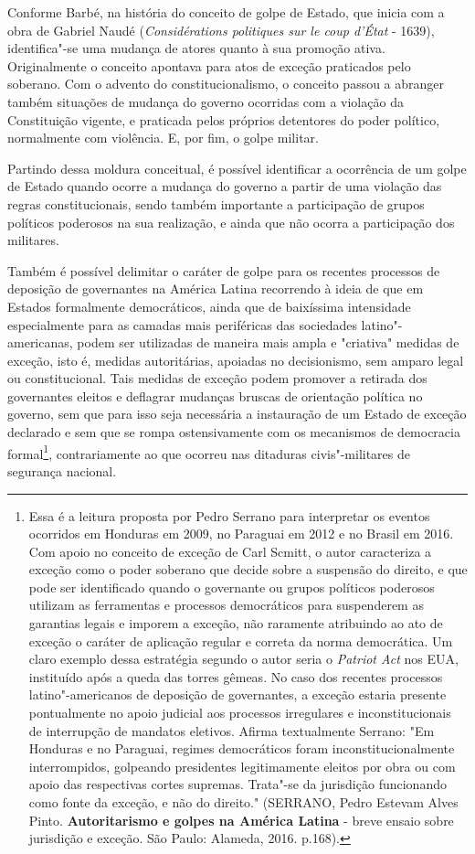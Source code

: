Conforme Barbé, na história do conceito de golpe de Estado, que inicia
com a obra de Gabriel Naudé (\emph{Considérations politiques sur le coup
d'État} - 1639), identifica"-se uma mudança de atores quanto à sua
promoção ativa. Originalmente o conceito apontava para atos de exceção
praticados pelo soberano. Com o advento do constitucionalismo, o
conceito passou a abranger também situações de mudança do governo
ocorridas com a violação da Constituição vigente, e praticada pelos
próprios detentores do poder político, normalmente com violência. E, por
fim, o golpe militar.

Partindo dessa moldura conceitual, é possível identificar a ocorrência
de um golpe de Estado quando ocorre a mudança do governo a partir de uma
violação das regras constitucionais, sendo também importante a
participação de grupos políticos poderosos na sua realização, e ainda
que não ocorra a participação dos militares.

Também é possível delimitar o caráter de golpe para os recentes
processos de deposição de governantes na América Latina recorrendo à
ideia de que em Estados formalmente democráticos, ainda que de
baixíssima intensidade especialmente para as camadas mais periféricas
das sociedades latino"-americanas, podem ser utilizadas de maneira mais
ampla e "criativa" medidas de exceção, isto é, medidas autoritárias,
apoiadas no decisionismo, sem amparo legal ou constitucional. Tais
medidas de exceção podem promover a retirada dos governantes eleitos e
deflagrar mudanças bruscas de orientação política no governo, sem que
para isso seja necessária a instauração de um Estado de exceção
declarado e sem que se rompa ostensivamente com os mecanismos de
democracia formal\footnote{Essa é a leitura proposta por Pedro Serrano
  para interpretar os eventos ocorridos em Honduras em 2009, no Paraguai
  em 2012 e no Brasil em 2016. Com apoio no conceito de exceção de Carl
  Scmitt, o autor caracteriza a exceção como o poder soberano que decide
  sobre a suspensão do direito, e que pode ser identificado quando o
  governante ou grupos políticos poderosos utilizam as ferramentas e
  processos democráticos para suspenderem as garantias legais e imporem
  a exceção, não raramente atribuindo ao ato de exceção o caráter de
  aplicação regular e correta da norma democrática. Um claro exemplo
  dessa estratégia segundo o autor seria o \emph{Patriot Act} nos EUA,
  instituído após a queda das torres gêmeas. No caso dos recentes
  processos latino"-americanos de deposição de governantes, a exceção
  estaria presente pontualmente no apoio judicial aos processos
  irregulares e inconstitucionais de interrupção de mandatos eletivos.
  Afirma textualmente Serrano: "Em Honduras e no Paraguai, regimes
  democráticos foram inconstitucionalmente interrompidos, golpeando
  presidentes legitimamente eleitos por obra ou com apoio das
  respectivas cortes supremas. Trata"-se da jurisdição funcionando como
  fonte da exceção, e não do direito." (SERRANO, Pedro Estevam Alves
  Pinto. \textbf{Autoritarismo e golpes na América Latina} - breve
  ensaio sobre jurisdição e exceção. São Paulo: Alameda, 2016. p.168).},
contrariamente ao que ocorreu nas ditaduras civis"-militares de segurança
nacional.

